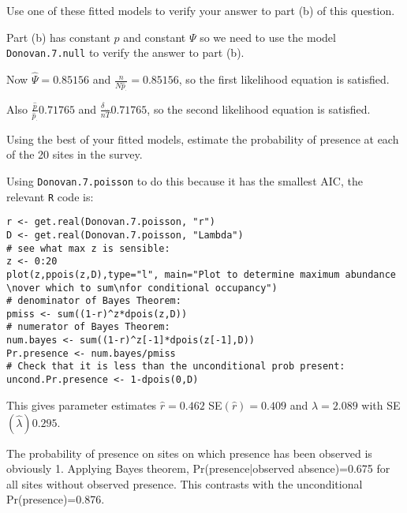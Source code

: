 \begin{questions}
\begin{parts}
{\begin{solution}
\end{solution}}

\item Use one of these fitted models to verify your answer to part (b) of this question.

{\begin{solution}
Part (b) has constant $p$ and constant $\Psi$ so we need to use the model \verb|Donovan.7.null| to verify the answer to part (b).

Now $\hat{\Psi}=0.85156$ and $\frac{n}{N\hat{p}_\cdot}=0.85156$, so the first likelihood equation is satisfied.

Also $\frac{\hat{p}}{\hat{p}_\cdot}0.71765$ and $\frac{\delta_{\cdot\cdot}}{nT}0.71765$, so the second likelihood equation is satisfied. \end{solution}}

\item Using the best of your fitted models, estimate the probability of presence at each of the 20 sites in the survey.

{\begin{solution}
Using \verb|Donovan.7.poisson| to do this because it has the smallest AIC, the relevant \verb|R| code is:
\begin{verbatim}
r <- get.real(Donovan.7.poisson, "r")
D <- get.real(Donovan.7.poisson, "Lambda")
# see what max z is sensible:
z <- 0:20
plot(z,ppois(z,D),type="l", main="Plot to determine maximum abundance \nover which to sum\nfor conditional occupancy")
# denominator of Bayes Theorem:
pmiss <- sum((1-r)^z*dpois(z,D))
# numerator of Bayes Theorem:
num.bayes <- sum((1-r)^z[-1]*dpois(z[-1],D))
Pr.presence <- num.bayes/pmiss
# Check that it is less than the unconditional prob present:
uncond.Pr.presence <- 1-dpois(0,D)
\end{verbatim}
This gives parameter estimates $\hat{r}=0.462$ SE$(\hat{r})=0.409$ and $\hat{\lambda}=2.089$ with SE$(\hat{\lambda})0.295$.

The probability of presence on sites on which presence has been observed is obviously 1. Applying Bayes theorem, Pr(presence|observed absence)=0.675 for all sites without observed presence.  This contrasts with the unconditional Pr(presence)=0.876.

\end{solution}}

\end{parts}


\end{questions}
